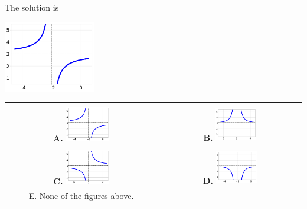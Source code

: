 \documentclass{article}[14pt]
\begin{document}
 
 The solution is  
 \begin{center} \includegraphics[width=0.3\textwidth]{../Figures/rationalEquationToGraphCA.png} \end{center}\begin{tabular}{|c|c|} 
\hline 
 & \tabularnewline 
 \textbf{A.} \includegraphics[width=0.3\textwidth]{../Figures/rationalEquationToGraphCA.png} & \textbf{B.} \includegraphics[width=0.3\textwidth]{../Figures/rationalEquationToGraphCB.png} \tabularnewline 
\hline 
 & \tabularnewline 
 \textbf{C.} \includegraphics[width=0.3\textwidth]{../Figures/rationalEquationToGraphCC.png} & \textbf{D.} \includegraphics[width=0.3\textwidth]{../Figures/rationalEquationToGraphCD.png} \tabularnewline 
\hline 
 E. None of the figures above. & \tabularnewline 
\hline 
 \end{tabular} 
 
\end{document}
